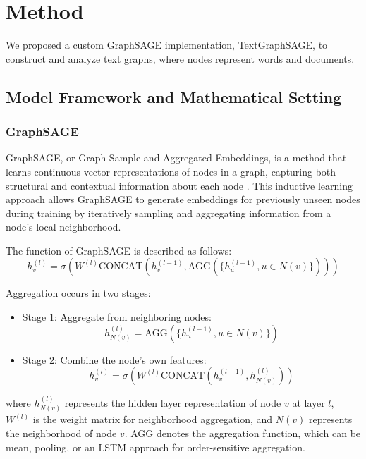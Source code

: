 \documentclass{article}
\begin{document}
\section{Method}

We proposed a custom GraphSAGE implementation, TextGraphSAGE, to construct and analyze text graphs, where nodes represent words and documents.

\subsection{Model Framework and Mathematical Setting}

\subsubsection{GraphSAGE}
GraphSAGE, or Graph Sample and Aggregated Embeddings, is a method that learns continuous vector representations of nodes in a graph, capturing both structural and contextual information about each node \cite{Hamilton2017GraphSAGE}. This inductive learning approach allows GraphSAGE to generate embeddings for previously unseen nodes during training by iteratively sampling and aggregating information from a node's local neighborhood.

The function of GraphSAGE is described as follows:
\begin{equation}
h_v^{(l)} = \sigma \left( W^{(l)} \text{CONCAT} \left( h_v^{(l-1)}, \text{AGG}\left( \{h_u^{(l-1)}, u \in N(v)\} \right) \right) \right)
\end{equation}

Aggregation occurs in two stages:
\begin{itemize}
    \item Stage 1: Aggregate from neighboring nodes:
    \begin{equation}
    h_{N(v)}^{(l)} = \text{AGG}\left( \{h_u^{(l-1)}, u \in N(v)\} \right)
    \end{equation}

    \item Stage 2: Combine the node's own features:
    \begin{equation}
    h_v^{(l)} = \sigma \left( W^{(l)} \text{CONCAT} \left( h_v^{(l-1)}, h_{N(v)}^{(l)} \right) \right)
    \end{equation}
\end{itemize}

where $h_{N(v)}^{(l)}$ represents the hidden layer representation of node $v$ at layer $l$, $W^{(l)}$ is the weight matrix for neighborhood aggregation, and $N(v)$ represents the neighborhood of node $v$. AGG denotes the aggregation function, which can be mean, pooling, or an LSTM approach for order-sensitive aggregation.
\end{document}
